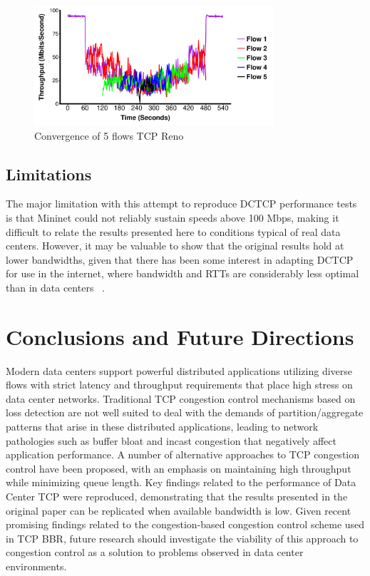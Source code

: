 \begin{figure}
\includegraphics[height=1.75in,width=3.5in]{reno_converg}
\caption{Convergence of 5 flows TCP Reno}
\end{figure}

\subsection{Limitations}

The major limitation with this attempt to reproduce DCTCP performance tests is that Mininet could not reliably sustain speeds above 100 Mbps, making it difficult to relate the results presented here to conditions typical of real data centers. However, it may be valuable to show that the original results hold at lower bandwidths, given that there has been some interest in adapting DCTCP for use in the internet, where bandwidth and RTTs are considerably less optimal than in data centers ~\cite{kuhlewind_using_2014}.

\section{Conclusions and Future Directions}

Modern data centers support powerful distributed applications utilizing diverse flows with strict latency and throughput requirements that place high stress on data center networks. Traditional TCP congestion control mechanisms based on loss detection are not well suited to deal with the demands of partition/aggregate patterns that arise in these distributed applications, leading to network pathologies such as buffer bloat and incast congestion that negatively affect application performance. A number of alternative approaches to TCP congestion control have been proposed, with an emphasis on maintaining high throughput while minimizing queue length. Key findings related to the performance of Data Center TCP were reproduced, demonstrating that the results presented in the original paper can be replicated when available bandwidth is low. Given recent promising findings related to the congestion-based congestion control scheme used in TCP BBR, future research should investigate the viability of this approach to congestion control as a solution to problems observed in data center environments.
